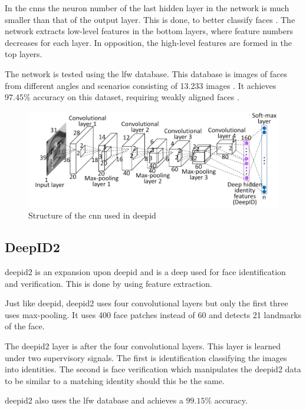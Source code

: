 In the \gls{cnn}s the neuron number of the last hidden layer in the network is much smaller than that of the output layer. This is done, to better classify faces \citep{deepID2014}. The network extracts low-level features in the bottom layers, where feature numbers decreases for each layer. In opposition, the high-level features are formed in the top layers.

The network is tested using the \gls{lfw} database. This database is images of faces from different angles and scenarios consisting of 13.233 images \citep{lfw2007}. It achieves $97.45\%$ accuracy on this dataset, requiring weakly aligned faces \citep{deepID2014}.

\begin{figure}[h]
	\centering
	\includegraphics[width=\textwidth]{figures/deepid_convnet}
	\caption{Structure of the \gls{cnn} used in \gls{deepid} \citep{deepID2014}}
	\label{fig:deepid_convnet}
\end{figure}

\subsection{DeepID2}
\gls{deepid2} is an expansion upon \gls{deepid} and is a deep  used for face identification and verification. This is done by using feature extraction.

Just like \gls{deepid}, \gls{deepid2} uses four convolutional layers but only the first three uses max-pooling. It uses 400 face patches instead of 60 \citep{deepID2014,sun2014} and detects 21 landmarks of the face.

The \gls{deepid2} layer is after the four convolutional layers. This layer is learned under two supervisory signals. The first is identification classifying the images into identities. The second is face verification which manipulates the \gls{deepid2} data to be similar to a matching identity should this be the same.

\gls{deepid2} also uses the \gls{lfw} database and achieves a $99.15\%$ accuracy.

